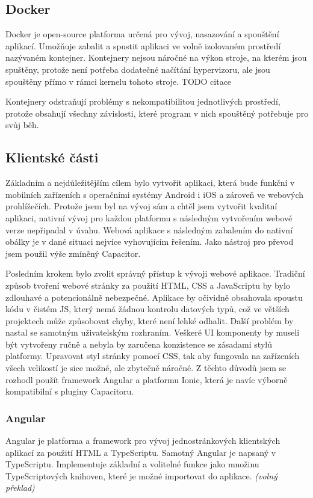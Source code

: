 \documentclass[
  biblatex,
  glossaries,
  index
]{kidiplom}
\begin{document}
\subsection{Docker}
Docker je open-source platforma určená pro vývoj, nasazování a spouštění aplikací. Umožňuje zabalit a spustit aplikaci ve volně izolovaném prostředí nazývaném kontejner. Kontejnery nejsou náročné na výkon stroje, na kterém jsou spuštěny, protože není potřeba dodatečné načítání hypervizoru, ale jsou spouštěny přímo v rámci kernelu tohoto stroje.
TODO citace


Kontejnery odstraňují problémy s nekompatibilitou jednotlivých prostředí, protože obsahují všechny závislosti, které program v nich spouštěný potřebuje pro svůj běh.
 
\subsection{Klientské části}
Základním a nejdůležitějším cílem bylo vytvořit aplikaci, která bude funkční v mobilních zařízeních s operačními systémy Android i iOS a zároveň ve webových prohlížečích. Protože jsem byl na vývoj sám a chtěl jsem vytvořit kvalitní aplikaci, nativní vývoj pro každou platformu s následným vytvořením webové verze nepřipadal v úvahu. Webová aplikace s následným zabalením do nativní obálky je v dané situaci nejvíce vyhovujícím řešením. Jako nástroj pro převod jsem použil výše zmíněný Capacitor. 

Posledním krokem bylo zvolit správný přístup k vývoji webové aplikace. Tradiční způsob tvoření webové stránky za použití HTML, CSS a JavaScriptu by bylo zdlouhavé a potencionálně nebezpečné. Aplikace by očividně obsahovala spoustu kódu v čistém JS, který nemá žádnou kontrolu datových typů, což ve větších projektech může způsobovat chyby, které není lehké odhalit. Další problém by nastal se samotným uživatelským rozhraním. Veškeré UI komponenty by museli být vytvořeny ručně a nebyla by zaručena konzistence se zásadami stylů platformy. Upravovat styl stránky pomocí CSS, tak aby fungovala na zařízeních všech velikostí je sice možné, ale zbytečně náročné. Z těchto důvodů jsem se rozhodl použít framework Angular a platformu Ionic, která je navíc výborně kompatibilní s pluginy Capacitoru.

\subsubsection{Angular}
\label{sec:angular}
Angular je platforma a framework pro vývoj jednostránkových klientských aplikací za použití HTML a TypeScriptu. Samotný Angular je napsaný v TypeScriptu. Implementuje základní a volitelné funkce jako množinu TypeScriptových knihoven, které je možné importovat do aplikace. \cite{8} \textit{(volný překlad)} 
\end{document}
